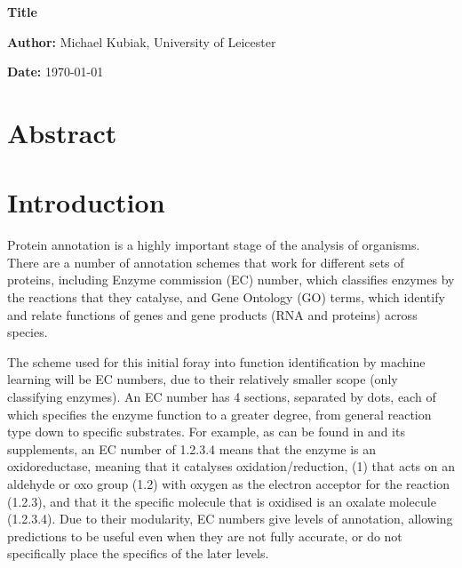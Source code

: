 \documentclass[12pt]{report}
\begin{document}
	\vspace*{\fill}
		\begin{center}
			\huge\textbf{Title}

			\vspace*{2cm}
			
			\large\textbf{Author:} Michael Kubiak, University of Leicester

			\vspace*{.5cm}

			\textbf{Date:} \today
			
		
		\end{center}
	\vspace*{\fill}

\pagebreak

	\section*{Abstract}
		
		
		
\pagebreak

	\tableofcontents

\pagebreak

	\section{Introduction}
		Protein annotation is a highly important stage of the analysis of organisms.  There are a number of annotation schemes that work for different sets of proteins, including Enzyme commission (EC) number, which classifies enzymes by the reactions that they catalyse, and Gene Ontology (GO) terms, which identify and relate functions of genes and gene products (RNA and proteins) across species.  
		
		The scheme used for this initial foray into function identification by machine learning will be EC numbers, due to their relatively smaller scope (only classifying enzymes).  An EC number has 4 sections, separated by dots, each of which specifies the enzyme function to a greater degree, from general reaction type down to specific substrates. For example, as can be found in \citep{RefWorks:doc:5d70e98ce4b0ef464262611a} and its supplements, an EC number of 1.2.3.4 means that the enzyme is an oxidoreductase, meaning that it catalyses oxidation/reduction, (1) that acts on an aldehyde or oxo group (1.2) with oxygen as the electron acceptor for the reaction (1.2.3), and that it the specific molecule that is oxidised is an oxalate molecule (1.2.3.4).  Due to their modularity, EC numbers give levels of annotation, allowing predictions to be useful even when they are not fully accurate, or do not specifically place the specifics of the later levels.
		
\end{document}
